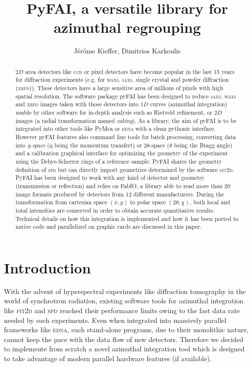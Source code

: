 \documentclass[a4paper]{jpconf}
\begin{document}
\title{PyFAI, a versatile library for azimuthal regrouping}

\author{J\'er\^ome Kieffer, Dimitrios Karkoulis}

\address{European Synchrotron Radiation Facility; 6 rue Jules Horowitz;
38043 Grenoble; France}


\begin{abstract}
$2D$ area detectors like \textsc{ccd} or pixel detectors have become popular
in the last 15 years for diffraction experiments (e.g. for \textsc{waxs},
\textsc{saxs}, single crystal and powder diffraction (\textsc{xrpd})).
These detectors have a large sensitive area of millions of pixels with  high
spatial resolution. The software package pyFAI has been designed to reduce
\textsc{saxs}, \textsc{waxs} and \textsc{xrpd} images taken with those detectors
into $1D$ curves (azimuthal integration) usable by other software for
in-depth analysis such as Rietveld refinement, or $2D$ images (a radial
transformation named \textit{caking}).
As a library, the aim of pyFAI is to be integrated into other tools like
PyMca or \textsc{edna} with a clean pythonic interface.
However pyFAI features also command line tools for batch processing, converting
data into {\em q-space} (q being the momentum transfert) or 2$\theta$-space
($\theta$ being the Bragg angle) and a calibration graphical interface for
optimizing the geometry of the experiment using the Debye-Scherrer rings of a
reference sample.  
PyFAI shares the geometry definition of \textsc{spd} but can directly import
geometries determined by the software \textsc{fit2d}.
PyFAI has been designed to work with any kind of detector and geometry
(transmission or reflection) and relies on FabIO, a library able to read more 
than 20 image formats produced by detectors from 12 different manufacturers.
During the transformation from cartesian space $(x,y)$ to polar
space $(2\theta, \chi )$, both local and total intensities are conserved
in order to obtain accurate quantitative results. Technical details on how this
integration is implemented and how it has been ported to native code and
parallelized on graphic cards are discussed in this paper.
\end{abstract}

\section{Introduction}

With the advent of hyperspectral experiments like diffraction tomography in the
world of synchrotron radiation, existing software tools for azimuthal
integration like \textsc{fit2d}\cite{fit2d1996} and \textsc{spd}\cite{spd} reached their
performance limits owing to the fast data rate needed by such experiments. Even
when integrated into massively parallel frameworks like
\textsc{edna}\cite{edna}, such stand-alone programs, due to their monolithic
nature, cannot keep the pace with the data flow of new detectors.
Therefore we decided to implemente from scratch a novel azimuthal integration
tool which is designed to take advantage of modern parallel hardware features
(if available).
\end{document}

